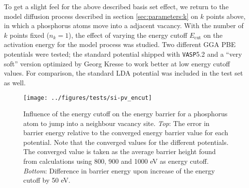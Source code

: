 \documentclass[11pt,bibliography=totoc,index=totoc]{scrbook}   %
\newcommand{\vasp}{{\texttt{VASP}}} %
\begin{document}
To get a slight feel for the above described basis set effect, we return to the model diffusion process described in section \ref{sec:parameters:k} on $k$ points above, in which a phosphorus atoms move into a adjacent vacancy. 
With the number of $k$ points fixed ($n_k=1$), the effect of varying the energy cutoff $E_{\text{cut}}$ on the activation energy for the model process was studied. Two different GGA PBE potentials were tested; the standard potential shipped with \vasp 5.2 and a ``very soft'' version optimized by Georg Kresse to work better at low energy cutoff values. For comparison, the standard LDA potential was included in the test set as well.



\begin{figure}[htbp]
  \begin{center}
    \texttt{[image: ../figures/tests/si-pv\_encut]}
  \end{center}
  \caption{Influence of the energy cutoff on the energy barrier for a phosphorus atom to jump into a neighbour vacancy site. 
  \textit{Top}: The error in barrier energy relative to the converged energy barrier value for each potential. 
  Note that the converged values for the different potentials.
  The converged value is taken as the average barrier height found from calculations using 800, 900 and 1000 eV as energy cutoff.
  \textit{Bottom}: Difference in barrier energy upon increase of the energy cutoff by 50 eV.}
  \label{fig:tests/si-pv_encut}
\end{figure}
\end{document}
